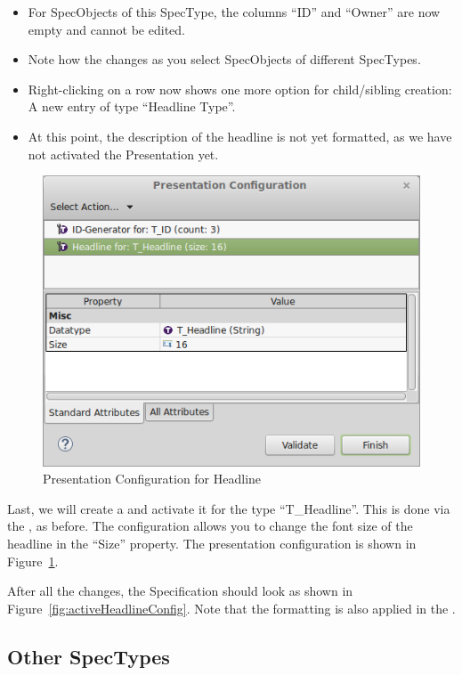 \begin{itemize}
\item
  For SpecObjects of this SpecType, the columns ``ID'' and ``Owner'' are now empty and cannot be edited.
\item
  Note how the  changes as you select SpecObjects of different SpecTypes.
\item
  Right-clicking on a row now shows one more option for child/sibling creation: A new entry of type ``Headline Type''.
\item At this point, the description of the headline is not yet formatted, as we have not activated the Presentation yet.
\end{itemize}

\begin{figure}
\centering      
\includegraphics[width=0.8\linewidth]{../rmf-images/Presentation_headline.png}      
\caption{Presentation Configuration for Headline}      
\label{fig:headlineConfig2}
\end{figure}

Last, we will create a  and activate it for the type ``T\_Headline''.  This is done via the , as before.  The configuration allows you to change the font size of the headline in the ``Size'' property.  The presentation configuration is shown in Figure~\ref{fig:headlineConfig2}.

After all the changes, the Specification should look as shown in Figure~\ref{fig:activeHeadlineConfig}.  Note that the formatting is also applied in the .

\subsection{Other SpecTypes}

